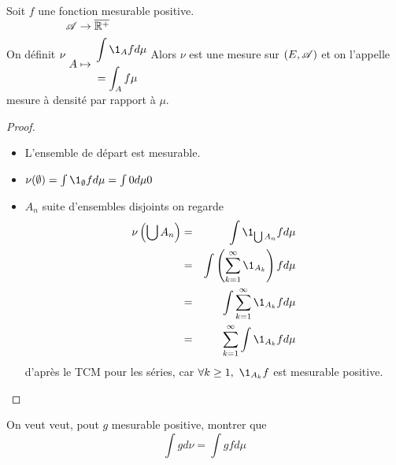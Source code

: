 \begin{definition}
	Soit $f$ une fonction mesurable positive. \\
	On définit $\nu\begin{aligned} %
			\triA & \to \Rbarp                  \\
			A     & \mapsto \begin{aligned}
				                 & \int \1_A f d\mu \\
				                 & = \int_A f\mu
			                \end{aligned}\end{aligned}$
	Alors $\nu$ est une mesure sur $(E, \mathscr{A})$ et on l'appelle mesure à densité par rapport à $\mu$.
\end{definition}

\begin{proof}
	\begin{itemize}
		\item L'ensemble de départ est mesurable.
		\item $\nu(\emptyset) = \int \1_{\emptyset} f d\mu = \int 0 d \mu 0$
		\item $A_n$ suite d'ensembles disjoints on regarde
		      \begin{eqnarray*}
			      \nu\left(\bigcup A_n\right) &=& \int \1_{\bigcup A_n} f d\mu \\
			      &=& \int \left( \sum_{k=1}^{\infty} \1_{A_k} \right) f d\mu \\
			      &=& \int \sum_{k=1}^{\infty} \1_{A_k} f d\mu \\
			      &=& \sum_{k=1}^{\infty} \int \1_{A_k} f d\mu
		      \end{eqnarray*}
		      d'après le TCM pour les séries, car $\forall k \geq 1, \ \1_{A_k}f$ est mesurable positive.
	\end{itemize}
\end{proof}

\begin{remarque} \label{rem:transfert}
	On veut veut, pout $g$ mesurable positive, montrer que
	$$ \int g d\nu = \int g f d\mu $$
\end{remarque}

